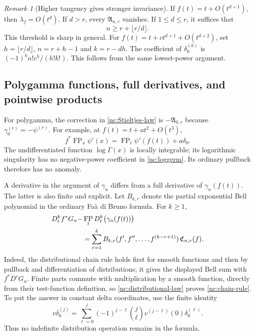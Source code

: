 \documentclass[11pt,a4paper]{article}
\numberwithin{equation}{section}
\theoremstyle{definition}
\theoremstyle{remark}
\newtheorem{remark}[theorem]{Remark}
\DeclareMathOperator{\FP}{FP}
\begin{document}
\begin{remark}[Higher tangency gives stronger invariance]
\label{nc:higher-tangency}
If $f(t)=t+O(t^{d+1})$, then $\lambda_f=O(t^d)$. If $d>r$, every
$\mathfrak A_{n,r}$ vanishes. If $1\leq d\leq r$, it suffices that
\[
 n\geq r+\lfloor r/d\rfloor.
\]
This threshold is sharp in general. For
$f(t)=t+c t^{d+1}+O(t^{d+2})$, set
$h=\lfloor r/d\rfloor$, $n=r+h-1$ and $k=r-dh$. The coefficient of
$\delta_0^{(k)}$ is
$(-1)^kn!c^h/(h!k!)$. This follows from the same lowest-power argument.
\end{remark}

\subsection{Polygamma functions, full derivatives, and pointwise products}

For polygamma, the correction in
\eqref{nc:Stieltjes-law} is $-\mathfrak A_{0,r}$ because
$\gamma_0^{(r)}=-\psi^{(r)}$. For example, at
$f(t)=t+a t^2+O(t^3)$,
\begin{equation}\label{nc:trigamma}
 f^*\FP_x\psi'(x)
    =\FP_t\psi'(f(t))+a\delta_0.
\end{equation}
The undifferentiated function $\log\Gamma(x)$ is locally integrable;
its logarithmic singularity has no negative-power coefficient in
\eqref{nc:loggerm}. Its ordinary pullback therefore has no anomaly.

A derivative in the argument of $\gamma_n$ differs from a full
derivative of $\gamma_n(f(t))$. The latter is also finite and explicit.
Let $B_{k,r}$ denote the partial exponential Bell polynomial in the
ordinary Fa\`a di Bruno formula. For $k\geq1$,
\begin{align}\label{nc:chain-rule}
 D_t^kf^*G_n-&\FP_tD_t^k\bigl(\gamma_n(f(t))\bigr)\notag\\
   &=\sum_{r=1}^k
       B_{k,r}(f',f'',\ldots,f^{(k-r+1)})\,
                         \mathfrak C_{n,r}(f).
\end{align}
Indeed, the distributional chain rule holds first for smooth functions
and then by pullback and differentiation of distributions; it gives
the displayed Bell sum with $f^*D^rG_n$. Finite parts commute with
multiplication by a smooth function, directly from their test-function
definition, so \eqref{nc:distributional-law} proves
\eqref{nc:chain-rule}. To put the answer in constant delta coordinates,
use the finite identity
\begin{equation}\label{nc:delta-multiplier}
 v\delta_0^{(j)}
   =\sum_{\ell=0}^j(-1)^{j-\ell}\binom j\ell
       v^{(j-\ell)}(0)\delta_0^{(\ell)}.
\end{equation}
Thus no indefinite distribution operation remains in the formula.
\end{document}
